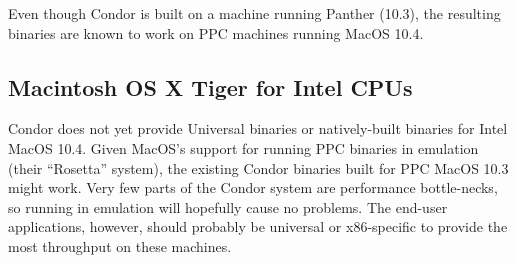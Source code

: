 Even though Condor \VersionNotice 
is built on a machine running Panther (10.3), the resulting binaries
are known to work on PPC machines running MacOS 10.4.


\subsection{\label{sec:platform-macos-tiger-x86}Macintosh OS X Tiger
 for Intel CPUs}

Condor does not yet provide Universal binaries or natively-built
binaries for Intel MacOS 10.4.
Given MacOS's support for running PPC binaries in emulation (their
``Rosetta'' system), the existing Condor binaries built for PPC MacOS
10.3 might work.
Very few parts of the Condor system are performance bottle-necks, so
running in emulation will hopefully cause no problems.
The end-user applications, however, should probably be universal or
x86-specific to provide the most throughput on these machines.

